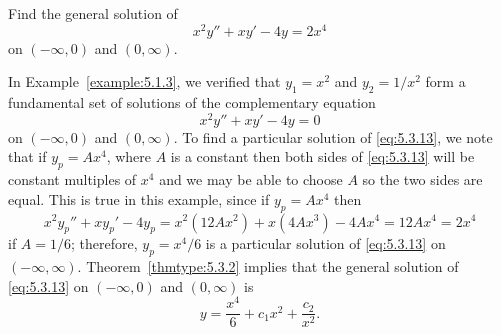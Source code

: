 \documentclass{ximera}
\begin{document}
\begin{example}
\begin{explanation}
\begin{center}
\end{center}
 
 
\end{explanation}
\end{example}
 
\begin{example}\label{example:5.3.3}
Find the general solution of
\begin{equation} \label{eq:5.3.13}
x^2y''+xy'-4y=2x^4
\end{equation}
on $(-\infty,0)$ and $(0,\infty)$.
 
 
\begin{explanation}
In Example~\ref{example:5.1.3},  we verified that $y_1=x^2$ and $y_2=1/x^2$
form a fundamental set of solutions of the complementary equation
$$
x^2y''+xy'-4y=0
$$
on $(-\infty,0)$ and $(0,\infty)$.  To find a particular solution of
\eqref{eq:5.3.13}, we note that if
$y_p=Ax^4$, where $A$ is a constant then  both sides of \eqref{eq:5.3.13}
will be constant
multiples  of $x^4$ and  we may be able to choose  $A$ so the two sides
are equal. This is true in this example, since if $y_p=Ax^4$ then
$$
x^2y_p''+xy_p'-4y_p=x^2(12Ax^2)+x(4Ax^3)-4Ax^4=12Ax^4=2x^4
$$
if $A=1/6$;  therefore, $y_p=x^4/6$ is a particular solution of
\eqref{eq:5.3.13} on  $(-\infty,\infty)$.
Theorem~\ref{thmtype:5.3.2} implies that the general solution of
\eqref{eq:5.3.13} on  $(-\infty,0)$ and  $(0,\infty)$ is
$$
y=\frac{x^4}{6}+c_1x^2+\frac{c_2}{x^2}.
$$
\end{explanation}
\end{example}
 
\end{document}
